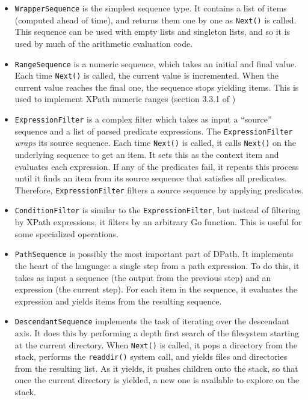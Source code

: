 \documentclass{article}
\begin{document}
\begin{itemize}
\item \texttt{WrapperSequence} is the simplest sequence type. It contains a list
  of items (computed ahead of time), and returns them one by one as
  \texttt{Next()} is called. This sequence can be used with empty lists and
  singleton lists, and so it is used by much of the arithmetic evaluation code.
\item \texttt{RangeSequence} is a numeric sequence, which takes an initial and
  final value. Each time \texttt{Next()} is called, the current value is
  incremented. When the current value reaches the final one, the sequence stops
  yielding items. This is used to implement XPath numeric ranges (section 3.3.1
  of \cite{xpath})
\item \texttt{ExpressionFilter} is a complex filter which takes as input a
  ``source'' sequence and a list of parsed predicate expressions. The
  \texttt{ExpressionFilter} \emph{wraps} its source sequence. Each time
  \texttt{Next()} is called, it calls \texttt{Next()} on the underlying sequence
  to get an item. It sets this as the context item and evaluates each
  expression. If any of the predicates fail, it repeats this process until it
  finds an item from its source sequence that satisfies all predicates.
  Therefore, \texttt{ExpressionFilter} filters a source sequence by applying
  predicates.
\item \texttt{ConditionFilter} is similar to the \texttt{ExpressionFilter}, but
  instead of filtering by XPath expressions, it filters by an arbitrary Go
  function. This is useful for some specialized operations.
\item \texttt{PathSequence} is possibly the most important part of DPath. It
  implements the heart of the language: a single step from a path expression. To
  do this, it takes as input a sequence (the output from the previous step) and
  an expression (the current step). For each item in the sequence, it evaluates
  the expression and yields items from the resulting sequence.
\item \texttt{DescendantSequence} implements the task of iterating over the
  descendant axis. It does this by performing a depth first search of the
  filesystem starting at the current directory. When \texttt{Next()} is called,
  it pops a directory from the stack, performs the \texttt{readdir()} system
  call, and yields files and directories from the resulting list. As it yields,
  it pushes children onto the stack, so that once the current directory is
  yielded, a new one is available to explore on the stack.
\end{itemize}
\end{document}
